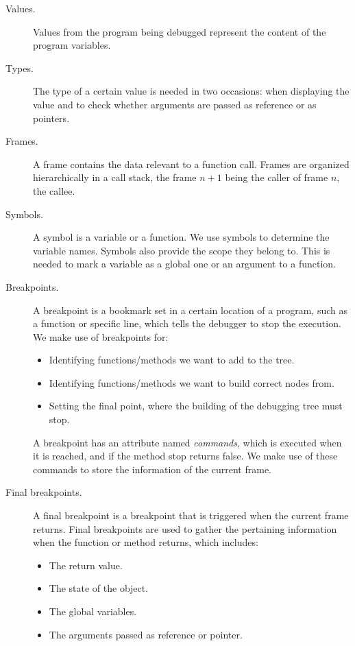 \begin{description}

\item[Values.]
Values from the program being debugged represent the content of the program variables.

\item[Types.]
The type of a certain value is needed in two occasions: when displaying the value and to check whether arguments are passed as reference or as pointers.
\item[Frames.] 
A frame contains the data relevant to a function call.
Frames are organized hierarchically in a call stack, the frame \(n+1\) being the caller of frame \(n\), the callee.
\item[Symbols.] A symbol is a variable or a function. We use symbols to determine the variable names. Symbols also provide the scope they belong to. This is needed to mark a variable as a global one or an argument to a function.

\item[Breakpoints.]
A breakpoint is a bookmark set in a certain location of a program, such as a function or specific line, which tells the debugger to stop the execution.
We make use of breakpoints for:
\begin{itemize}
    \item Identifying functions/methods we want to add to the tree.
    \item Identifying functions/methods we want to build correct nodes from.
    \item Setting the final point, where the building of the debugging tree must stop.
\end{itemize}
A breakpoint has an attribute named \emph{commands}, which is executed when it is reached, and if the method stop returns false.
%
We make use of these commands to store the information of the current frame.

\item[Final breakpoints.]
A final breakpoint is a breakpoint that is triggered when the current frame returns. Final breakpoints are used to gather the pertaining information when the function or method returns, which includes:
\begin{itemize}
    \item The return value.
    \item The state of the object.
    \item The global variables.
    \item The arguments passed as reference or pointer.
\end{itemize}
\end{description}
